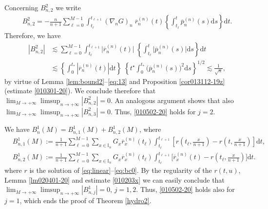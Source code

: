 \documentclass[EJP]{ejpecp} %
\newcommand\T{{\mathbb I}}
\newcommand{\dd  }{\mathrm{d}}
\renewcommand{\bar}{\overline}
\numberwithin{equation}{section}
\begin{document}
Concerning $B_{n,2}^2$ we write
\begin{align*}
B_{n,2}^2=-\frac{n}{n+1}\sum_{\ell=0}^{M-1} \int_{t_\ell}^{t_{\ell+1}}(\nabla_nG)_n\; \bar
r^{(n)}_n (t) \left\{\int_{t_\ell}^t\bar
p^{(n)}_n (s)\dd s \right\} \dd t.
\end{align*}
Therefore,  we have
\begin{align*}
|B_{n,2}^2| & \lesssim\sum_{\ell=0}^{M-1} \int_{t_\ell}^{t_{\ell+1}}\big|\bar
r^{(n)}_n (t)\big| \; \left\{\int_{t_\ell}^t\big|\bar
p^{(n)}_n (s)\big|\dd s \right\}  \dd t
\\ & \lesssim  \left\{\int_{0}^{t_*}|\bar
r^{(n)}_n (t)| \dd t \right\}\; \left\{ t^\star \int_{0}^{t_*}\big(\bar
p^{(n)}_n (s)\big)^2 \dd s\right\}^{1/2} \lesssim \frac{1}{\sqrt n},
\end{align*}
by virtue of Lemma \ref{lem:bound2}--\eqref{eq:13} and Proposition \ref{cor013112-19z} (estimate
\eqref{010301-20}).
We conclude therefore that $\lim_{M\to+\infty}\limsup_{n\to+\infty}|B_{n,2}^2|=0$.
An analogous argument shows that also
$\lim_{M\to+\infty}\limsup_{n\to+\infty}|B_{n,3}^2|=0$. Thus,
\eqref{010502-20} holds for $j=2$.






We have $B^1_{n}(M)=
B_{n,1}^1(M)+ B_{n,2}^1(M)$, where
\begin{align*}
&
B_{n,1}^1(M):=\frac{1}{n+1}\sum_{\ell=0}^{M-1}\sum_{x\in\T_n}G_x\bar
r^{(n)}_x (t_\ell) 
\int_{t_\ell}^{t_{\ell+1}}\left[r \left(t_{\ell},\tfrac{x}{n+1}\right) -r\left(t,\tfrac{x}{n+1}\right) \right]\dd t,\\
&
B_{n,2}^1(M) :=\frac{1}{n+1}\sum_{\ell=0}^{M-1}\sum_{x\in\T_n}G_x\bar
r^{(n)}_x (t_\ell) \int_{t_\ell}^{t_{\ell+1}}\Big[\bar
r^{(n)}_x (t)- r \left(t_{\ell},\tfrac{x}{n+1}\right)\Big]\dd t.
\end{align*}
where $r$ is the solution of \eqref{eq:linear}--\eqref{eq:bc0}. 
By the regularity of the
 $r(t,u)$, Lemma \ref{lm020401-20} and estimate \eqref{010203x} we can
 easily conclude that
$\lim_{M\to+\infty}\limsup_{n\to+\infty}|B_{n,j}^1|=0$, $j=1,2$. Thus,
\eqref{010502-20} holds also for $j=1$, which ends the proof of
Theorem \ref{hydro2}.
\end{document}

